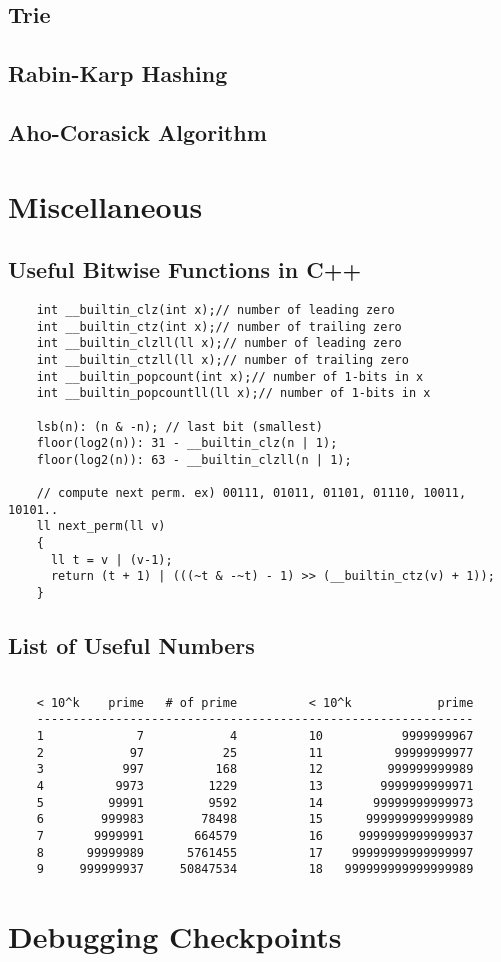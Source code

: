 \documentclass[landscape,8pt]{article}
\begin{document}
\begin{multicols}{2}
  \subsection{Trie}

  \subsection{Rabin-Karp Hashing}

  \subsection{Aho-Corasick Algorithm}
\columnbreak
\section{Miscellaneous}
  \subsection{Useful Bitwise Functions in C++}
  \begin{verbatim}
    int __builtin_clz(int x);// number of leading zero
    int __builtin_ctz(int x);// number of trailing zero
    int __builtin_clzll(ll x);// number of leading zero
    int __builtin_ctzll(ll x);// number of trailing zero
    int __builtin_popcount(int x);// number of 1-bits in x
    int __builtin_popcountll(ll x);// number of 1-bits in x

    lsb(n): (n & -n); // last bit (smallest)
    floor(log2(n)): 31 - __builtin_clz(n | 1);
    floor(log2(n)): 63 - __builtin_clzll(n | 1);

    // compute next perm. ex) 00111, 01011, 01101, 01110, 10011, 10101..
    ll next_perm(ll v)
    {
      ll t = v | (v-1);
      return (t + 1) | (((~t & -~t) - 1) >> (__builtin_ctz(v) + 1));
    }
  \end{verbatim}
  \columnbreak
  \subsection{List of Useful Numbers}
  \begin{verbatim}

    < 10^k    prime   # of prime          < 10^k            prime
    -------------------------------------------------------------
    1             7            4          10           9999999967
    2            97           25          11          99999999977
    3           997          168          12         999999999989
    4          9973         1229          13        9999999999971
    5         99991         9592          14       99999999999973
    6        999983        78498          15      999999999999989
    7       9999991       664579          16     9999999999999937
    8      99999989      5761455          17    99999999999999997
    9     999999937     50847534          18   999999999999999989
  \end{verbatim}
\columnbreak
\section{Debugging Checkpoints}
\end{multicols}
\end{document}
